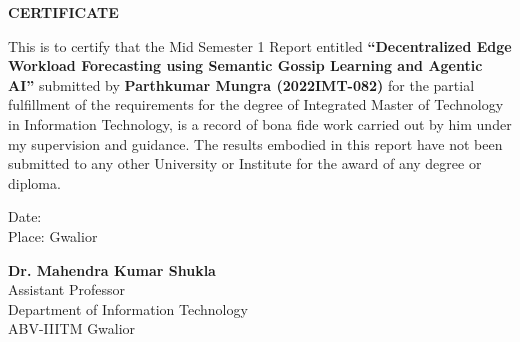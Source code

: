 \begin{center}
\vspace*{0.5in}
\textbf{CERTIFICATE}\\
\end{center}
\vspace*{0.2in}
This is to certify that the Mid Semester 1 Report entitled \textbf{``Decentralized Edge Workload Forecasting using Semantic Gossip Learning and Agentic AI''} submitted by \textbf{Parthkumar Mungra (2022IMT-082)} for the partial fulfillment of the requirements for the degree of Integrated Master of Technology in Information Technology, is a record of bona fide work carried out by him under my supervision and guidance. The results embodied in this report have not been submitted to any other University or Institute for the award of any degree or diploma.

\vspace{1.5in}
\noindent
\begin{minipage}[t]{0.5\textwidth}
Date: \\
Place: Gwalior
\end{minipage}
\begin{minipage}[t]{0.5\textwidth}
\textbf{Dr. Mahendra Kumar Shukla}\\
Assistant Professor\\
Department of Information Technology\\
ABV-IIITM Gwalior
\end{minipage}
